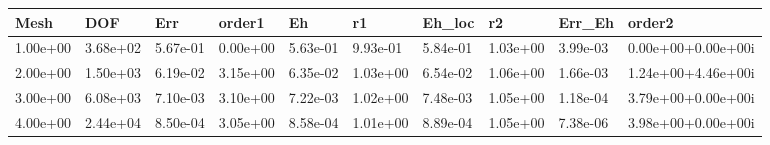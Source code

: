 \begin{tabular}{llllllllll}
Mesh & DOF & Err & order1 & Eh & r1 & Eh_loc & r2 & Err_Eh & order2 \\ 
\hline 
1.00e+00 & 3.68e+02 & 5.67e-01 & 0.00e+00 & 5.63e-01 & 9.93e-01 & 5.84e-01 & 1.03e+00 & 3.99e-03 & 0.00e+00+0.00e+00i \\ 
2.00e+00 & 1.50e+03 & 6.19e-02 & 3.15e+00 & 6.35e-02 & 1.03e+00 & 6.54e-02 & 1.06e+00 & 1.66e-03 & 1.24e+00+4.46e+00i \\ 
3.00e+00 & 6.08e+03 & 7.10e-03 & 3.10e+00 & 7.22e-03 & 1.02e+00 & 7.48e-03 & 1.05e+00 & 1.18e-04 & 3.79e+00+0.00e+00i \\ 
4.00e+00 & 2.44e+04 & 8.50e-04 & 3.05e+00 & 8.58e-04 & 1.01e+00 & 8.89e-04 & 1.05e+00 & 7.38e-06 & 3.98e+00+0.00e+00i \\ 
\hline 
\end{tabular}